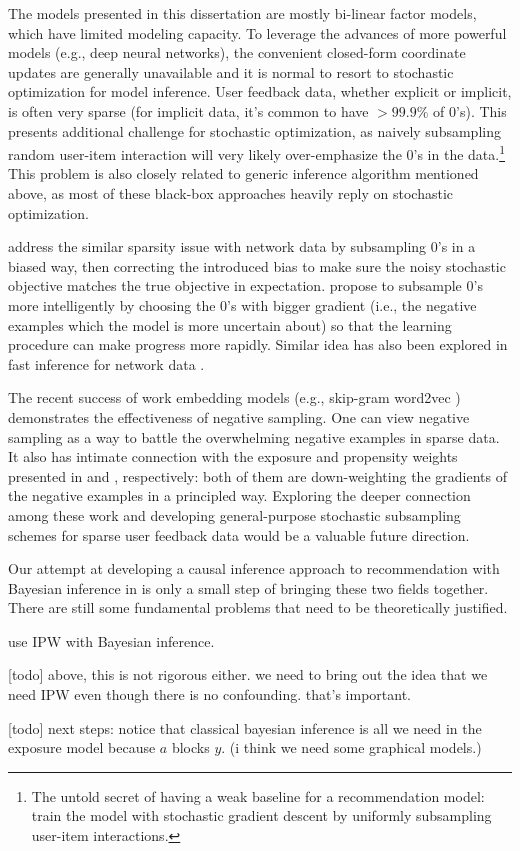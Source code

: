 The models presented in this dissertation are mostly bi-linear factor models, which have limited modeling capacity. To leverage the advances of more powerful models (e.g., deep neural networks), the convenient closed-form coordinate updates are generally unavailable and it is normal to resort to stochastic optimization for model inference. User feedback data, whether explicit or implicit, is often very sparse (for implicit data, it's common to have $>99.9\%$ of 0's). This presents additional challenge for stochastic optimization, as naively subsampling random user-item interaction will very likely over-emphasize the 0's in the data.\footnote{The untold secret of having a weak baseline for a recommendation model: train the model with stochastic gradient descent by uniformly subsampling user-item interactions.} This problem is also closely related to generic inference algorithm mentioned above, as most of these black-box approaches heavily reply on stochastic optimization.

\citet{gopalan2013efficient} address the similar sparsity issue with network data by subsampling 0's in a biased way, then correcting the introduced bias to make sure the noisy stochastic objective matches the true objective in expectation. 
\citet{rendle2014improving} propose to subsample 0's more intelligently by choosing the 0's with bigger gradient (i.e., the negative examples which the model is more uncertain about) so that the learning procedure can make progress more rapidly. Similar idea has also been explored in fast inference for network data \citep{raftery2012fast}. 

The recent success of work embedding models (e.g., skip-gram word2vec \citep{mikolov2013distributed}) demonstrates the effectiveness of negative sampling. One can view negative sampling as a way to battle the overwhelming negative examples in sparse data. It also has intimate connection with the exposure and propensity weights presented in  and , respectively: both of them are down-weighting the gradients of the negative examples in a principled way. Exploring the deeper connection among these work and developing general-purpose stochastic subsampling schemes for sparse user feedback data would be a valuable future direction. 

 Our attempt at developing a causal inference approach to recommendation with Bayesian inference in  is only a small step of bringing these two fields together. There are still some fundamental problems that need to be theoretically justified. 

\PP use IPW with Bayesian inference.

\PP \citet{rubin1978bayesian}

[todo] above, this is not rigorous either.  we need to bring out the
idea that we need IPW even though there is no confounding.  that's
important.

[todo] next steps: notice that classical bayesian inference is all
we need in the exposure model because $a$ blocks $y$.  (i think we
need some graphical models.)
